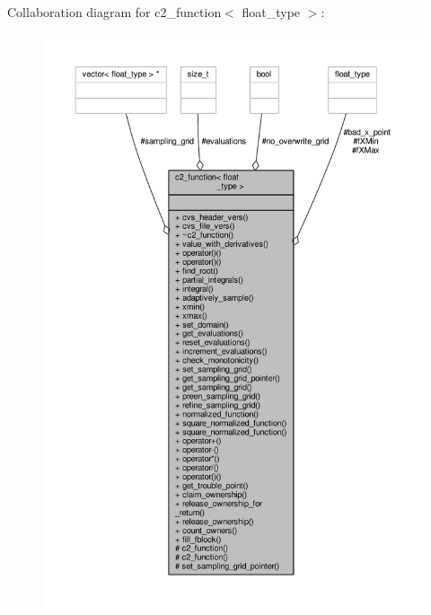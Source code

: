 Collaboration diagram for c2\+\_\+function$<$ float\+\_\+type $>$\+:
\nopagebreak
\begin{figure}[H]
\begin{center}
\leavevmode
\includegraphics[width=350pt]{classc2__function__coll__graph}
\end{center}
\end{figure}
